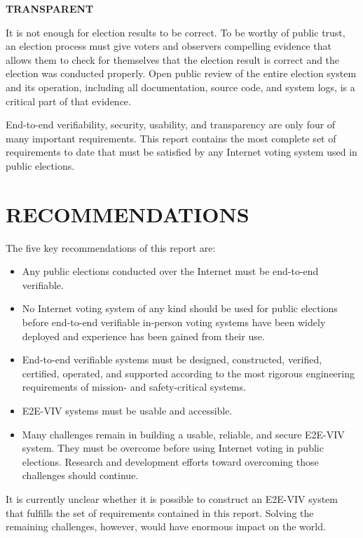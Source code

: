 \noindent \textbf{TRANSPARENT}

It is not enough for election results to be correct. To be worthy of
public trust, an election process must give voters and observers
compelling evidence that allows them to check for themselves that the
election result is correct and the election was conducted
properly. Open public review of the entire election system and its
operation, including all documentation, source code, and system logs,
is a critical part of that evidence.

\vspace{1cm}

End-to-end verifiability, security, usability, and transparency are
only four of many important requirements. This report contains the
most complete set of requirements to date that must be satisfied by
any Internet voting system used in public elections.

\newpage

\section*{RECOMMENDATIONS}

The five key recommendations of this report are:
\begin{itemize}
\item Any public elections conducted over the Internet must be
  end-to-end verifiable.
\item No Internet voting system of any kind should be used for public
  elections before end-to-end verifiable in-person voting systems have
  been widely deployed and experience has been gained from their use.
\item End-to-end verifiable systems must be designed, constructed,
  verified, certified, operated, and supported according to the most
  rigorous engineering requirements of mission- and safety-critical
  systems.
\item E2E-VIV systems must be usable and accessible.
\item Many challenges remain in building a usable, reliable, and
  secure E2E-VIV system. They must be overcome before using Internet
  voting in public elections. Research and development efforts toward
  overcoming those challenges should continue.
\end{itemize}

It is currently unclear whether it is possible to construct an E2E-VIV
system that fulfills the set of requirements contained in this
report. Solving the remaining challenges, however, would have enormous
impact on the world.

